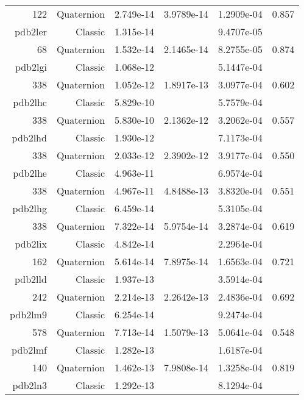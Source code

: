 \begin{xltabular}{\textwidth}{r|rS[table-format=1.3e+2]S[table-format=1.4e+2]S[table-format=1.4e+2]S[table-format=-1.3]}
122 & Quaternion & 2.749e-14 & 3.9789e-14 & 1.2909e-04 & 0.857\\  \addlinespace
{\color{red} pdb2ler } & Classic & 1.315e-14 &  & 9.4707e-05 & \\
68 & Quaternion & 1.532e-14 & 2.1465e-14 & 8.2755e-05 & 0.874\\  \addlinespace
{\color{red} pdb2lgi } & Classic & 1.068e-12 &  & 5.1447e-04 & \\
338 & Quaternion & 1.052e-12 & 1.8917e-13 & 3.0977e-04 & 0.602\\  \addlinespace
{\color{red} pdb2lhc } & Classic & 5.829e-10 &  & 5.7579e-04 & \\
338 & Quaternion & 5.830e-10 & 2.1362e-12 & 3.2062e-04 & 0.557\\  \addlinespace
{\color{red} pdb2lhd } & Classic & 1.930e-12 &  & 7.1173e-04 & \\
338 & Quaternion & 2.033e-12 & 2.3902e-12 & 3.9177e-04 & 0.550\\  \addlinespace
{\color{red} pdb2lhe } & Classic & 4.963e-11 &  & 6.9574e-04 & \\
338 & Quaternion & 4.967e-11 & 4.8488e-13 & 3.8320e-04 & 0.551\\  \addlinespace
{\color{red} pdb2lhg } & Classic & 6.459e-14 &  & 5.3105e-04 & \\
338 & Quaternion & 7.322e-14 & 5.9754e-14 & 3.2874e-04 & 0.619\\  \addlinespace
{\color{red} pdb2lix } & Classic & 4.842e-14 &  & 2.2964e-04 & \\
162 & Quaternion & 5.614e-14 & 7.8975e-14 & 1.6563e-04 & 0.721\\  \addlinespace
{\color{red} pdb2lld } & Classic & 1.937e-13 &  & 3.5914e-04 & \\
242 & Quaternion & 2.214e-13 & 2.2642e-13 & 2.4836e-04 & 0.692\\  \addlinespace
{\color{red} pdb2lm9 } & Classic & 6.254e-14 &  & 9.2474e-04 & \\
578 & Quaternion & 7.713e-14 & 1.5079e-13 & 5.0641e-04 & 0.548\\  \addlinespace
{\color{red} pdb2lmf } & Classic & 1.282e-13 &  & 1.6187e-04 & \\
140 & Quaternion & 1.462e-13 & 7.9808e-14 & 1.3258e-04 & 0.819\\  \addlinespace
{\color{red} pdb2ln3 } & Classic & 1.292e-13 &  & 8.1294e-04 & \\

\end{xltabular}
